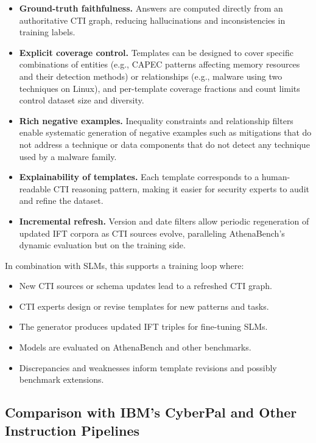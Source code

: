 \documentclass[10pt]{article}
\begin{document}
\begin{itemize}[leftmargin=*]
  \item \textbf{Ground-truth faithfulness.} Answers are computed directly from an authoritative CTI graph, reducing hallucinations and inconsistencies in training labels.
  \item \textbf{Explicit coverage control.} Templates can be designed to cover specific combinations of entities (e.g., CAPEC patterns affecting memory resources and their detection methods) or relationships (e.g., malware using two techniques on Linux), and per-template coverage fractions and count limits control dataset size and diversity.\cite{cardei2025ift}
  \item \textbf{Rich negative examples.} Inequality constraints and relationship filters enable systematic generation of negative examples such as mitigations that do not address a technique or data components that do not detect any technique used by a malware family.
  \item \textbf{Explainability of templates.} Each template corresponds to a human-readable CTI reasoning pattern, making it easier for security experts to audit and refine the dataset.
  \item \textbf{Incremental refresh.} Version and date filters allow periodic regeneration of updated IFT corpora as CTI sources evolve, paralleling AthenaBench’s dynamic evaluation but on the training side.\cite{cardei2025ift,alam2025athenabench}
\end{itemize}

In combination with SLMs, this supports a training loop where:

\begin{itemize}[leftmargin=*]
  \item New CTI sources or schema updates lead to a refreshed CTI graph.
  \item CTI experts design or revise templates for new patterns and tasks.
  \item The generator produces updated IFT triples for fine-tuning SLMs.
  \item Models are evaluated on AthenaBench and other benchmarks.
  \item Discrepancies and weaknesses inform template revisions and possibly benchmark extensions.
\end{itemize}

\subsection{Comparison with IBM’s CyberPal and Other Instruction Pipelines}
\end{document}
